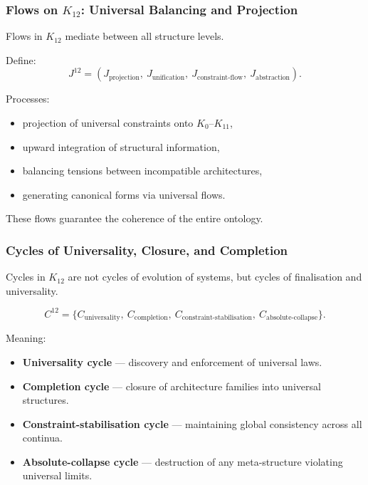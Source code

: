 \subsubsection{Flows on $K_{12}$: Universal Balancing and Projection}

Flows in $K_{12}$ mediate between all structure levels.

Define:
\[
J^{12} = 
(J_{\text{projection}},\ J_{\text{unification}},\ 
 J_{\text{constraint-flow}},\ J_{\text{abstraction}}).
\]

Processes:
\begin{itemize}
    \item projection of universal constraints onto $K_0$--$K_{11}$,
    \item upward integration of structural information,
    \item balancing tensions between incompatible architectures,
    \item generating canonical forms via universal flows.
\end{itemize}

These flows guarantee the coherence of the entire ontology.

\subsubsection{Cycles of Universality, Closure, and Completion}

Cycles in $K_{12}$ are not cycles of evolution of systems,
but cycles of finalisation and universality.

\[
C^{12} = \{
C_{\text{universality}},\
C_{\text{completion}},\
C_{\text{constraint-stabilisation}},\
C_{\text{absolute-collapse}}
\}.
\]

Meaning:
\begin{itemize}
    \item \textbf{Universality cycle}  
      --- discovery and enforcement of universal laws.

    \item \textbf{Completion cycle}  
      --- closure of architecture families into universal structures.

    \item \textbf{Constraint-stabilisation cycle}  
      --- maintaining global consistency across all continua.

    \item \textbf{Absolute-collapse cycle}  
      --- destruction of any meta-structure violating universal limits.
\end{itemize}

